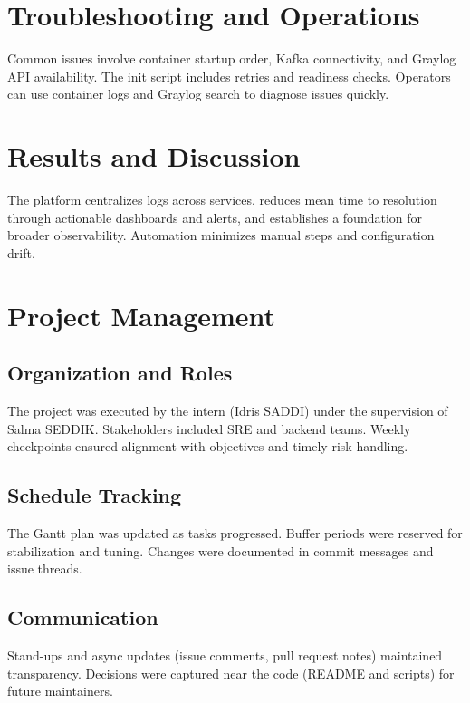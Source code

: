 \documentclass[12pt,a4paper]{report}
\begin{document}
\chapter{Troubleshooting and Operations}
Common issues involve container startup order, Kafka connectivity, and Graylog API availability. The init script includes retries and readiness checks. Operators can use container logs and Graylog search to diagnose issues quickly.

\chapter{Results and Discussion}
The platform centralizes logs across services, reduces mean time to resolution through actionable dashboards and alerts, and establishes a foundation for broader observability. Automation minimizes manual steps and configuration drift.

\chapter{Project Management}
\section{Organization and Roles}
The project was executed by the intern (Idris SADDI) under the supervision of Salma SEDDIK. Stakeholders included SRE and backend teams. Weekly checkpoints ensured alignment with objectives and timely risk handling.

\section{Schedule Tracking}
The Gantt plan was updated as tasks progressed. Buffer periods were reserved for stabilization and tuning. Changes were documented in commit messages and issue threads.

\section{Communication}
Stand-ups and async updates (issue comments, pull request notes) maintained transparency. Decisions were captured near the code (README and scripts) for future maintainers.
\end{document}
